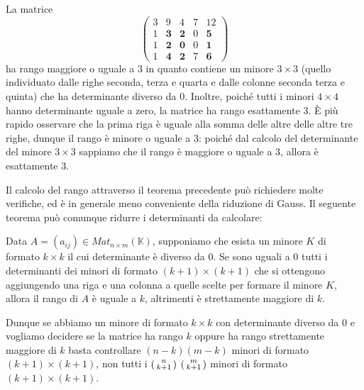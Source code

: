 \begin{example}
	La matrice
	\begin{equation*}
		\begin{pmatrix}
			3 & 9          & 4          & 7 & 12         \\
			1 & \textbf{3} & \textbf{2} & 0 & \textbf{5} \\
			1 & \textbf{2} & \textbf{0} & 0 & \textbf{1} \\
			1 & \textbf{4} & \textbf{2} & 7 & \textbf{6}
		\end{pmatrix}
	\end{equation*}
	ha rango maggiore o uguale a 3 in quanto contiene un minore $3 \times 3$
	(quello individuato dalle righe seconda, terza e quarta e dalle colonne
	seconda terza e quinta) che ha determinante diverso da 0. Inoltre, poich\'e
	tutti i minori $4 \times 4$ hanno determinante uguale a zero, la matrice ha
	rango esattamente 3. \`E pi\`u rapido osservare che la prima riga \`e uguale
	alla somma delle altre delle altre tre righe, dunque il rango \`e minore o
	uguale a 3: poich\'e dal calcolo del determinante del minore $3 \times 3$
	sappiamo che il rango \`e maggiore o uguale a 3, allora \`e esattamente 3.
\end{example}

Il calcolo del rango attraverso il teorema precedente pu\`o richiedere molte
verifiche, ed \`e in generale meno conveniente della riduzione di Gauss. Il
seguente teorema pu\`o comunque ridurre i determinanti da calcolare:

\begin{theorem}
	Data $A = (a_{ij}) \in Mat_{n \times m}(\mathbb{K})$, supponiamo
	che esista un minore $K$ di formato $k \times k$ il cui determinante \`e
	diverso da 0. Se sono uguali a 0 tutti i determinanti dei minori di formato
	$(k + 1) \times (k + 1)$ che si ottengono aggiungendo una riga e una colonna
	a quelle scelte per formare il minore $K$, allora il rango di $A$ \`e uguale
	a $k$, altrimenti \`e strettamente maggiore di $k$.
\end{theorem}

Dunque se abbiamo un minore di formato $k \times k$ con determinante diverso da 0
e vogliamo decidere se la matrice ha rango $k$ oppure ha rango strettamente
maggiore di $k$ basta controllare $(n - k)(m - k)$ minori di formato
$(k + 1) \times (k + 1)$, non tutti i
$\begin{psmallmatrix} n \\ k + 1 \end{psmallmatrix}$
$\begin{psmallmatrix} m \\ k + 1 \end{psmallmatrix}$ minori di formato
$(k + 1) \times (k + 1)$.

